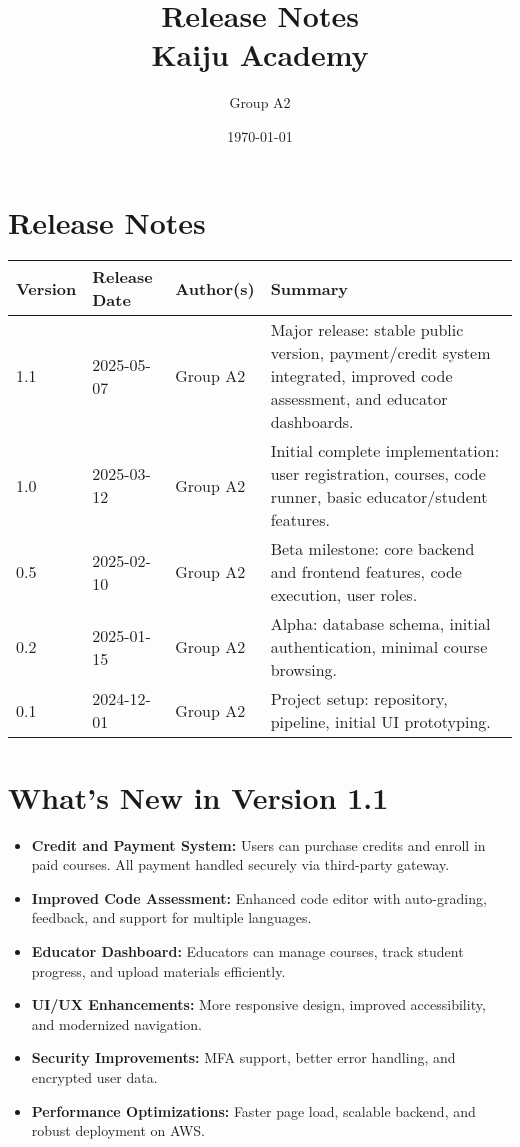 \documentclass[a4paper,11pt]{scrartcl}
\title{Release Notes\\Kaiju Academy}
\author{Group A2}
\date{\today}
\begin{document}
\maketitle

\section*{Release Notes}

\begin{tabularx}{\textwidth}{l l l X}
\toprule
Version & Release Date & Author(s) & Summary \\
\midrule
1.1 & 2025-05-07 & Group A2 & Major release: stable public version, payment/credit system integrated, improved code assessment, and educator dashboards. \\
1.0 & 2025-03-12 & Group A2 & Initial complete implementation: user registration, courses, code runner, basic educator/student features. \\
0.5 & 2025-02-10 & Group A2 & Beta milestone: core backend and frontend features, code execution, user roles. \\
0.2 & 2025-01-15 & Group A2 & Alpha: database schema, initial authentication, minimal course browsing. \\
0.1 & 2024-12-01 & Group A2 & Project setup: repository, pipeline, initial UI prototyping. \\
\bottomrule
\end{tabularx}

\vspace{1.5em}

\section{What's New in Version 1.1}

\begin{itemize}[leftmargin=*]
    \item \textbf{Credit and Payment System:} Users can purchase credits and enroll in paid courses. All payment handled securely via third-party gateway.
    \item \textbf{Improved Code Assessment:} Enhanced code editor with auto-grading, feedback, and support for multiple languages.
    \item \textbf{Educator Dashboard:} Educators can manage courses, track student progress, and upload materials efficiently.
    \item \textbf{UI/UX Enhancements:} More responsive design, improved accessibility, and modernized navigation.
    \item \textbf{Security Improvements:} MFA support, better error handling, and encrypted user data.
    \item \textbf{Performance Optimizations:} Faster page load, scalable backend, and robust deployment on AWS.
\end{itemize}
\end{document}
